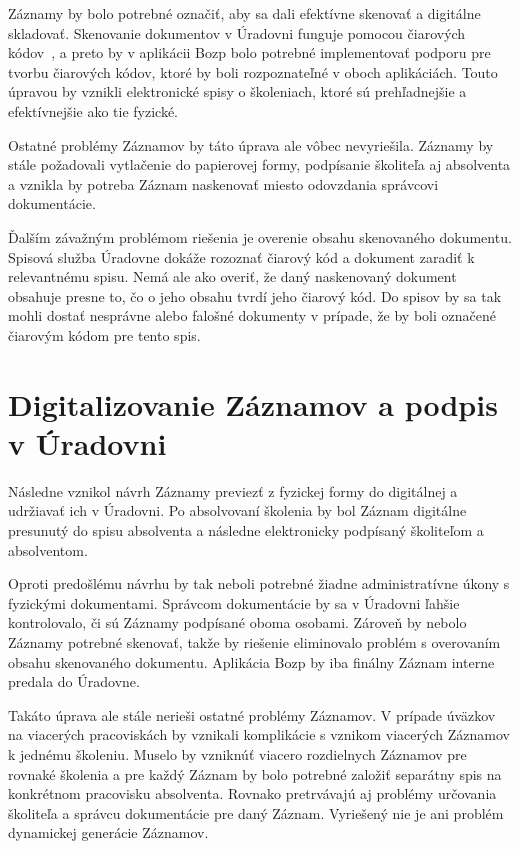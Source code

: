 \documentclass[
  digital,     %
  oneside,     %
  nosansbold,  %
  nocolorbold, %
  lof,         %
  nolot,         %
]{fithesis4}
\begin{document}
Záznamy by bolo potrebné označiť, aby sa dali efektívne skenovať a digitálne skladovať. Skenovanie dokumentov v Úradovni funguje pomocou čiarových kódov~\cite{uradovna2024}, a preto by v aplikácii Bozp bolo potrebné implementovať podporu pre tvorbu čiarových kódov, ktoré by boli rozpoznateľné v oboch aplikáciách. Touto úpravou by vznikli elektronické spisy o školeniach, ktoré sú prehľadnejšie a efektívnejšie ako tie fyzické.

Ostatné problémy Záznamov by táto úprava ale vôbec nevyriešila. Záznamy by stále požadovali vytlačenie do papierovej formy, podpísanie školiteľa aj absolventa a vznikla by potreba Záznam naskenovať miesto odovzdania správcovi dokumentácie. 

Ďalším závažným problémom riešenia je overenie obsahu skenovaného dokumentu. Spisová služba Úradovne dokáže rozoznať čiarový kód a dokument zaradiť k relevantnému spisu. Nemá ale ako overiť, že daný naskenovaný dokument obsahuje presne to, čo o jeho obsahu tvrdí jeho čiarový kód. Do spisov by sa tak mohli dostať nesprávne alebo falošné dokumenty v prípade, že by boli označené čiarovým kódom pre tento spis.

\section{Digitalizovanie Záznamov a podpis v Úradovni}
Následne vznikol návrh Záznamy previezť z fyzickej formy do digitálnej a udržiavať ich v Úradovni. Po absolvovaní školenia by bol Záznam digitálne presunutý do spisu absolventa a následne elektronicky podpísaný školiteľom a absolventom.

Oproti predošlému návrhu by tak neboli potrebné žiadne administratívne úkony s fyzickými dokumentami. Správcom dokumentácie by sa v Úradovni ľahšie kontrolovalo, či sú Záznamy podpísané oboma osobami. Zároveň by nebolo Záznamy potrebné skenovať, takže by riešenie eliminovalo problém s overovaním obsahu skenovaného dokumentu. Aplikácia Bozp by iba finálny Záznam interne predala do Úradovne.

Takáto úprava ale stále nerieši ostatné problémy Záznamov. V prípade úväzkov na viacerých pracoviskách by vznikali komplikácie s vznikom viacerých Záznamov k jednému školeniu. Muselo by vzniknúť viacero rozdielnych Záznamov pre rovnaké školenia a pre každý Záznam by bolo potrebné založiť separátny spis na konkrétnom pracovisku absolventa. Rovnako pretrvávajú aj problémy určovania školiteľa a správcu dokumentácie pre daný Záznam. Vyriešený nie je ani problém dynamickej generácie Záznamov.
\end{document}
